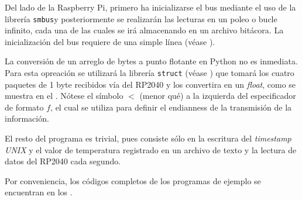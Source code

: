 

Del lado de la Raspberry Pi, primero ha inicializarse el bus \IIC mediante el uso de la librería \texttt{smbus}\footnotemark y posteriormente se realizarán las lecturas en un poleo o bucle infinito, cada una de las cuales se irá almacenando en un archivo bitácora.
La inicialización del bus requiere de una simple línea (véase ).



La conversión de un arreglo de bytes a punto flotante en Python no es inmediata.
Para esta opreación se utilizará la librería \texttt{struct} (véase ) que tomará los cuatro paquetes de 1 byte recibidos vía \IIC del RP2040 y los convertira en un \emph{float}, como se muestra en el .
Nótese el símbolo $<$ (menor qué) a la izquierda del especificador de formato $f$, el cual se utiliza para definir el endianness de la transmisión de la información.



El resto del programa es trivial, pues consiste sólo en la escritura del \emph{timestamp UNIX} y el valor de temperatura registrado en un archivo de texto y la lectura de datos del RP2040 cada segundo.

Por conveniencia, los códigos completos de los programas de ejemplo se encuentran en los .
